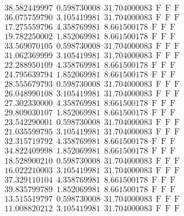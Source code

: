 \documentclass[10pt,a4paper]{article}
\begin{document}
\begin{itemize}
\begin{displaymath}
{\begin{aligned}
&38.582449997 ~~   0.598730008 ~~  31.704000083  ~~\mathrm{F  ~~ F  ~~  F} \\ 
&36.075759790 ~~   3.105419981 ~~  31.704000083  ~~\mathrm{F  ~~ F  ~~  F} \\ 
&17.275559796 ~~   4.358769981 ~~   8.661500178  ~~\mathrm{F  ~~ F  ~~  F} \\ 
&19.782250002 ~~   1.852069981 ~~   8.661500178  ~~\mathrm{F  ~~ F  ~~  F} \\ 
&33.569070105 ~~   0.598730008 ~~  31.704000083  ~~\mathrm{F  ~~ F  ~~  F} \\ 
&31.062369999 ~~   3.105419981 ~~  31.704000083  ~~\mathrm{F  ~~ F  ~~  F} \\ 
&22.288950109 ~~   4.358769981 ~~   8.661500178  ~~\mathrm{F  ~~ F  ~~  F} \\ 
&24.795639794 ~~   1.852069981 ~~   8.661500178  ~~\mathrm{F  ~~ F  ~~  F} \\ 
&28.555679793 ~~   0.598730008 ~~  31.704000083  ~~\mathrm{F  ~~ F  ~~  F} \\ 
&26.048990108 ~~   3.105419981 ~~  31.704000083  ~~\mathrm{F  ~~ F  ~~  F} \\ 
&27.302330000 ~~   4.358769981 ~~   8.661500178  ~~\mathrm{F  ~~ F  ~~  F} \\ 
&29.809030107 ~~   1.852069981 ~~   8.661500178  ~~\mathrm{F  ~~ F  ~~  F} \\ 
&23.542290001 ~~   0.598730008 ~~  31.704000083  ~~\mathrm{F  ~~ F  ~~  F} \\ 
&21.035599795 ~~   3.105419981 ~~  31.704000083  ~~\mathrm{F  ~~ F  ~~  F} \\ 
&32.315719792 ~~   4.358769981 ~~   8.661500178  ~~\mathrm{F  ~~ F  ~~  F} \\ 
&34.822409998 ~~   1.852069981 ~~   8.661500178  ~~\mathrm{F  ~~ F  ~~  F} \\ 
&18.528900210 ~~   0.598730008 ~~  31.704000083  ~~\mathrm{F  ~~ F  ~~  F} \\ 
&16.022210003 ~~   3.105419981 ~~  31.704000083  ~~\mathrm{F  ~~ F  ~~  F} \\ 
&37.329110104 ~~   4.358769981 ~~   8.661500178  ~~\mathrm{F  ~~ F  ~~  F} \\ 
&39.835799789 ~~   1.852069981 ~~   8.661500178  ~~\mathrm{F  ~~ F  ~~  F} \\ 
&13.515519797 ~~   0.598730008 ~~  31.704000083  ~~\mathrm{F  ~~ F  ~~  F} \\ 
&11.008820212 ~~   3.105419981 ~~  31.704000083  ~~\mathrm{F  ~~ F  ~~  F} \\ 

\end{aligned}}
\end{displaymath}
\end{itemize}
\end{document}
